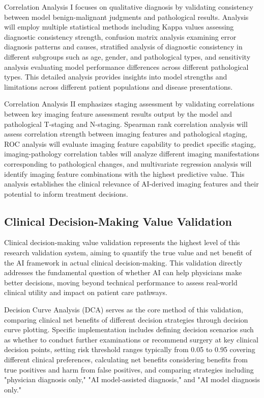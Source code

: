 Correlation Analysis I focuses on qualitative diagnosis by validating consistency between model benign-malignant judgments and pathological results. Analysis will employ multiple statistical methods including Kappa values assessing diagnostic consistency strength, confusion matrix analysis examining error diagnosis patterns and causes, stratified analysis of diagnostic consistency in different subgroups such as age, gender, and pathological types, and sensitivity analysis evaluating model performance differences across different pathological types. This detailed analysis provides insights into model strengths and limitations across different patient populations and disease presentations.

Correlation Analysis II emphasizes staging assessment by validating correlations between key imaging feature assessment results output by the model and pathological T-staging and N-staging. Spearman rank correlation analysis will assess correlation strength between imaging features and pathological staging, ROC analysis will evaluate imaging feature capability to predict specific staging, imaging-pathology correlation tables will analyze different imaging manifestations corresponding to pathological changes, and multivariate regression analysis will identify imaging feature combinations with the highest predictive value. This analysis establishes the clinical relevance of AI-derived imaging features and their potential to inform treatment decisions.

\subsection{Clinical Decision-Making Value Validation}

Clinical decision-making value validation represents the highest level of this research validation system, aiming to quantify the true value and net benefit of the AI framework in actual clinical decision-making. This validation directly addresses the fundamental question of whether AI can help physicians make better decisions, moving beyond technical performance to assess real-world clinical utility and impact on patient care pathways.

Decision Curve Analysis (DCA) serves as the core method of this validation, comparing clinical net benefits of different decision strategies through decision curve plotting. Specific implementation includes defining decision scenarios such as whether to conduct further examinations or recommend surgery at key clinical decision points, setting risk threshold ranges typically from 0.05 to 0.95 covering different clinical preferences, calculating net benefits considering benefits from true positives and harm from false positives, and comparing strategies including "physician diagnosis only," "AI model-assisted diagnosis," and "AI model diagnosis only."

